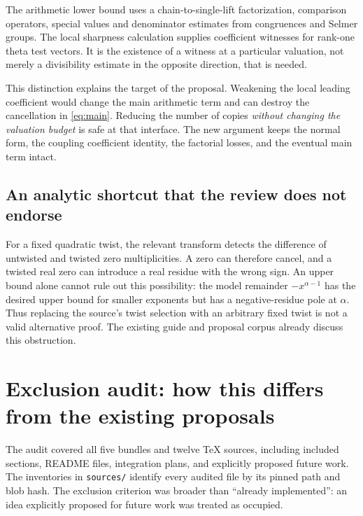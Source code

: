 \documentclass[11pt,letterpaper]{article}
\theoremstyle{remark}\newtheorem{remark}[theorem]{Remark}
\begin{document}
The arithmetic lower bound uses a chain-to-single-lift factorization,
comparison operators, special values and denominator estimates from
congruences and Selmer groups. The local sharpness calculation supplies
coefficient witnesses for rank-one theta test vectors. It is the existence
of a witness at a particular valuation, not merely a divisibility estimate
in the opposite direction, that is needed.

This distinction explains the target of the proposal. Weakening the local
leading coefficient would change the main arithmetic term and can destroy
the cancellation in \eqref{eq:main}. Reducing the number of copies
\emph{without changing the valuation budget} is safe at that interface.
The new argument keeps the normal form, the coupling coefficient identity,
the factorial losses, and the eventual main term intact.\cite{couplings,cases,boundattained}

\subsection{An analytic shortcut that the review does not endorse}

For a fixed quadratic twist, the relevant transform detects the difference
of untwisted and twisted zero multiplicities. A zero can therefore cancel,
and a twisted real zero can introduce a real residue with the wrong sign.
An upper bound alone cannot rule out this possibility: the model remainder
$-x^{\alpha-1}$ has the desired upper bound for smaller exponents but has a
negative-residue pole at $\alpha$. Thus replacing the source's twist selection
with an arbitrary fixed twist is not a valid alternative proof. The existing
guide and proposal corpus already discuss this obstruction.\cite{endpoint,guide,sparse}

\section{Exclusion audit: how this differs from the existing proposals}
\label{sec:exclusions}

The audit covered all five bundles and twelve TeX sources, including
included sections, README files, integration plans, and explicitly proposed
future work. The inventories in \texttt{sources/} identify every audited
file by its pinned path and blob hash. The exclusion criterion was broader
than ``already implemented'': an idea explicitly proposed for future work
was treated as occupied.
\end{document}
